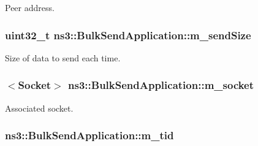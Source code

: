 Peer address. 

\subsubsection[{\texorpdfstring{m\+\_\+send\+Size}{m_sendSize}}]{\setlength{\rightskip}{0pt plus 5cm}uint32\+\_\+t ns3\+::\+Bulk\+Send\+Application\+::m\+\_\+send\+Size\hspace{0.3cm}{\ttfamily [private]}}\hypertarget{classns3_1_1BulkSendApplication_a9546f4e64ebd4043c2054a6830430f12}{}\label{classns3_1_1BulkSendApplication_a9546f4e64ebd4043c2054a6830430f12}


Size of data to send each time. 

\subsubsection[{\texorpdfstring{m\+\_\+socket}{m_socket}}]{$<${\bf Socket}$>$ ns3\+::\+Bulk\+Send\+Application\+::m\+\_\+socket\hspace{0.3cm}{\ttfamily [private]}}\hypertarget{classns3_1_1BulkSendApplication_ac77d828305505de6cd36753e32bec4c0}{}\label{classns3_1_1BulkSendApplication_ac77d828305505de6cd36753e32bec4c0}


Associated socket. 

\subsubsection[{\texorpdfstring{m\+\_\+tid}{m_tid}}]{ ns3\+::\+Bulk\+Send\+Application\+::m\+\_\+tid\hspace{0.3cm}{\ttfamily [private]}}\hypertarget{classns3_1_1BulkSendApplication_aae69cccb430dce06f51f507bccbb8396}{}\label{classns3_1_1BulkSendApplication_aae69cccb430dce06f51f507bccbb8396}


